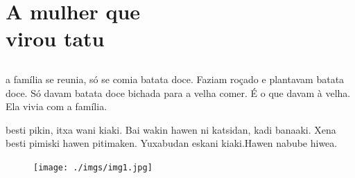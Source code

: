 \openany\raggedright

\blankpage
\part[A mulher que virou tatu]{A mulher que\\ virou tatu}

\chapter*{}

\mbox{}\vspace*{\fill}


\begingroup\setlength{\linewidth}{.6\linewidth}

 a família se reunia, só se comia
batata doce. Faziam roçado e plantavam
batata doce. Só davam batata doce bichada
para a velha comer. É o que davam à velha.
Ela vivia com a família.

\vspace{2em}


 besti pikin, itxa wani kiaki.
Bai wakin hawen ni katsidan, kadi banaaki.
Xena besti pimiski hawen pitimaken.
Yuxabudan eskani kiaki.Hawen
nabube hiwea.

\vspace*{\fill}

\pagebreak
\thispagestyle{empty}
\begin{figure}
\vspace*{-2cm}
\hspace*{-2.2cm}\texttt{[image: ./imgs/img1.jpg]}
\end{figure}

